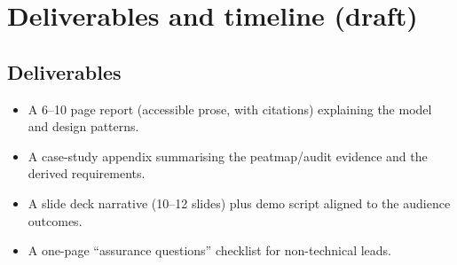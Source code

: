 \section{Deliverables and timeline (draft)}

\subsection{Deliverables}
\begin{itemize}[leftmargin=*]
  \item A 6--10 page report (accessible prose, with citations) explaining the model and design patterns.
  \item A case-study appendix summarising the peatmap/audit evidence and the derived requirements.
  \item A slide deck narrative (10--12 slides) plus demo script aligned to the audience outcomes.
  \item A one-page ``assurance questions'' checklist for non-technical leads.
\end{itemize}
